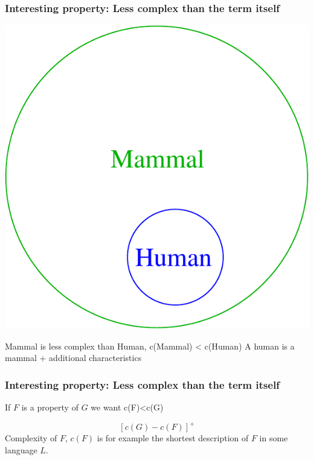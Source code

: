 \documentclass{beamer}
\begin{document}
\frame
{
  \frametitle{Interesting property: \alert{Less complex} than the term itself}

  \begin{center}
    \includegraphics[scale=0.4]{mammal_human.pdf}
  \end{center}
  
  \begin{beamerboxesrounded}{Mammal is \alert{less complex} than Human,
      c(Mammal) < c(Human)}
    A human is a mammal + additional characteristics 
  \end{beamerboxesrounded}
}

\frame
{
  \frametitle{Interesting property: \alert{Less complex} than the term itself}

  \begin{beamerboxesrounded}{If $F$ is a property of $G$ we want}
    c(F)<c(G)
  \end{beamerboxesrounded}

  \[[c(G)-c(F)]^+\]
  {\footnotesize Complexity of $F$, $c(F)$ is for example the
  shortest description of $F$ in some language $L$.}

}
\end{document}
